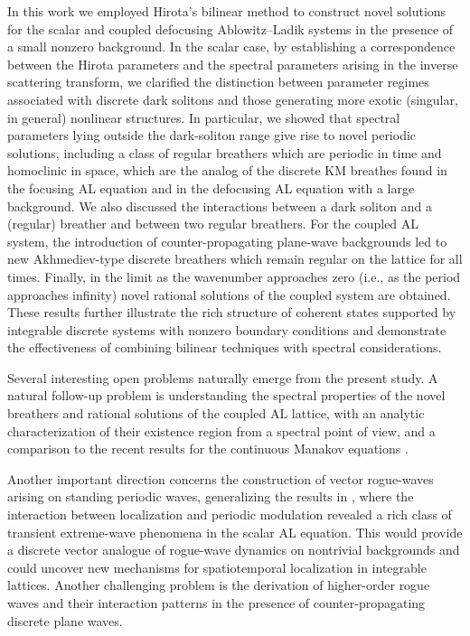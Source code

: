 \documentclass{article}
\begin{document}
In this work we employed Hirota’s bilinear method to construct novel solutions for the scalar and coupled defocusing Ablowitz–Ladik systems in the presence of a small nonzero background. In the scalar case, by establishing a correspondence between the Hirota parameters and the spectral parameters arising in the inverse scattering transform, we clarified the distinction between parameter regimes associated with discrete dark solitons and those generating more exotic (singular, in general) nonlinear structures. In particular, we showed that spectral parameters lying outside the dark-soliton range give rise to novel periodic solutions, including a class of regular breathers which are periodic in time and homoclinic in space, which are the analog of the discrete KM breathes found in the focusing AL equation and in the defocusing AL equation with a large background.  We also discussed the interactions between a dark soliton and a (regular) breather and between two regular breathers. For the coupled AL system, the introduction of counter-propagating plane-wave backgrounds led to new Akhmediev-type discrete breathers which remain regular on the lattice for all times. Finally, in the limit as the wavenumber approaches zero (i.e., as the period approaches infinity) novel rational solutions of the coupled system are obtained. These results further illustrate the rich structure of coherent states supported by integrable discrete systems with nonzero boundary conditions and demonstrate the effectiveness of combining bilinear techniques with spectral considerations.

Several interesting open problems naturally emerge from the present study. A natural follow-up problem is understanding the spectral properties of the novel breathers and rational solutions of the coupled AL lattice, with an analytic characterization of their existence region from a spectral point of view, and a comparison to the recent results for the continuous Manakov equations \cite{Akh24}.

Another important direction concerns the construction of vector rogue-waves arising on standing periodic waves, generalizing the results in \cite{Pel24,Bar26}, where the interaction between localization and periodic modulation revealed a rich class of transient extreme-wave phenomena in the scalar AL equation. This would provide a discrete vector analogue of rogue-wave dynamics on nontrivial backgrounds and could uncover new mechanisms for spatiotemporal localization in integrable lattices. Another challenging problem is the derivation of higher-order rogue waves and their interaction patterns in the presence of counter-propagating discrete plane waves.
\end{document}
